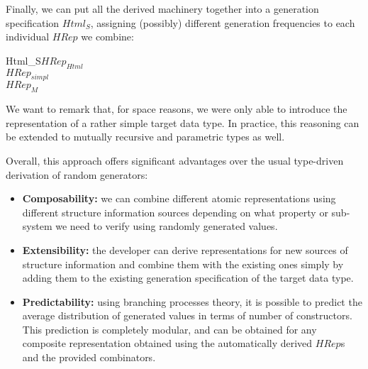 \documentclass[conference, fleqn]{IEEEtran}
\newcommand{\Conid}[1]{\mathit{#1}}
\def\resethooks{%
  \global\let\SaveRestoreHook\empty
  \global\let\ColumnHook\empty}
\let\hspre\empty
\let\hspost\empty
\newcommand{\hrep}[1]{\ensuremath{H\!Rep_{#1}}}
\begin{document}
Finally, we can put all the derived machinery together into a generation
specification \ensuremath{Html_S}, assigning (possibly) different generation frequencies to
each individual \ensuremath{\Conid{HRep}} we combine:

\begin{hscode}\SaveRestoreHook
\column{B}{@{}>{\hspre}l<{\hspost}@{}}%
\column{13}{@{}>{\hspre}l<{\hspost}@{}}%
\column{21}{@{}>{\hspre}l<{\hspost}@{}}%
\column{32}{@{}>{\hspre}l<{\hspost}@{}}%
\column{E}{@{}>{\hspre}l<{\hspost}@{}}%
\>[B]{}\;Html_S{}\<[13]%
\>[13]{}\mathrel{=}{}\<[21]%
\>[21]{}\hrep{Html}\;{}\<[32]%
\>[32]{}\otimes\;\<[E]%
\\
\>[13]{}\!\;\oplus\;{}\<[21]%
\>[21]{}\hrep{simpl}\;{}\<[32]%
\>[32]{}\otimes\;\<[E]%
\\
\>[13]{}\!\;\oplus\;{}\<[21]%
\>[21]{}\hrep{M}{}\<[E]%
\ColumnHook
\end{hscode}\resethooks


%   


We want to remark that, for space reasons, we were only able to introduce the
representation of a rather simple target data type.
%
In practice, this reasoning can be extended to mutually recursive and parametric
types as well.


Overall, this approach offers significant advantages over the usual type-driven
derivation of random generators:
%
\begin{itemize}
\item \textbf{Composability:} we can combine different atomic representations
  using different structure information sources depending on what property or
  sub-system we need to verify using randomly generated values.
\item \textbf{Extensibility:} the developer can derive representations for new
  sources of structure information and combine them with the existing ones
  simply by adding them to the existing generation specification of the target
  data type.
\item \textbf{Predictability:} using branching processes theory, it is possible
  to predict the average distribution of generated values in terms of number of
  constructors.
  This prediction is completely modular, and can be obtained for any composite
  representation obtained using the automatically derived \ensuremath{\Conid{HRep}}s and the
  provided combinators.
\end{itemize}
\end{document}
